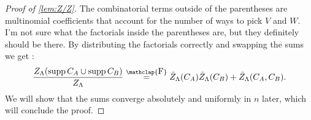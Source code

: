 \documentclass{article}
\DeclareMathOperator{\supp}{supp}
\newcommand\formeq{\stackrel{\mathclap{\normalfont\mbox{F}}}{=}}
\begin{document}
\begin{proof}[Proof of \cref{lem:Z/Z}]
     The combinatorial terms outside of the parentheses are multinomial coefficients that account for the number of ways to pick $V$ and $W$. 
     I’m not sure what the factorials inside the parentheses are, but they definitely should be there.
     By distributing the factorials correctly and swapping the sums we get :
     $$
     \frac{Z_\Lambda(\supp C_A\cup \supp C_B)}{Z_\Lambda}\formeq\hat Z_\Lambda(C_A)\hat Z_\Lambda(C_B)+\hat Z_\Lambda(C_A,C_B).
     $$
     We will show that the sums converge absolutely and uniformly in $n$ {\color{red}later}, which will conclude the proof.
 \end{proof} 
 \printbibliography
\end{document}
